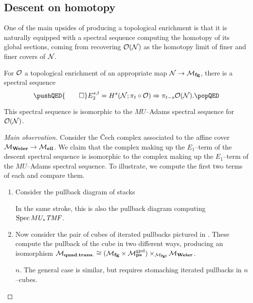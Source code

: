 \subsection*{Descent on homotopy}

One of the main upsides of producing a topological enrichment is that it is naturally equipped with a spectral sequence computing the homotopy of its global sections, coming from recovering $\mathcal{O}(\mathcal{N})$ as the homotopy limit of finer and finer covers of $\mathcal{N}$.

\begin{lemma}
For $\mathcal{O}$ a topological enrichment of an appropriate map $\mathcal{N} \to \mathcal{M}_{\mathbf{fg}}$, there is a spectral sequence \[\pushQED{\qed} E_2^{s, t} = H^s(\stack{N}; \pi_t \circ \sheaf O) \Rightarrow \pi_{t-s} \sheaf{O}(\stack{N}). \qedhere \popQED\]
\end{lemma}

\begin{lemma}
This spectral sequence is isomorphic to the $MU$--Adams spectral sequence for $\mathcal{O}(\mathcal{N})$.
\end{lemma}
\begin{proof}[Main observation]
Consider the \v{C}ech complex associated to the affine cover $\mathcal{M}_{\mathbf{Weier}} \to \mathcal{M}_{\mathbf{ell}}$.  We claim that the complex making up the $E_1$--term of the descent spectral sequence is isomorphic to the complex making up the $E_1$--term of the $MU$--Adams spectral sequence.  To illustrate, we compute the first two terms of each and compare them.
\begin{enumerate}
    \item Consider the pullback diagram of stacks
    \begin{center}
    \end{center}
    In the same stroke, this is also the pullback diagram computing $\operatorname{Spec} MU_* \mathit{TMF}$.
    \item Now consider the pair of cubes of iterated pullbacks pictured in .  These compute the pullback of the cube in two different ways, producing an isomorphism $\mathcal{M}_{\mathbf{quad.trans.}} \cong (\mathcal{M}_{\mathbf{fg}} \times \mathcal{M}_{\mathbf{ps}}^{\mathrm{gpd}}) \times_{\mathcal{M}_{\mathbf{fgl}}} \mathcal{M}_{\mathbf{Weier}}$.
    \item[$n$.] The general case is similar, but requires stomaching iterated pullbacks in $n$--cubes. \qedhere
\end{enumerate}
\end{proof}

